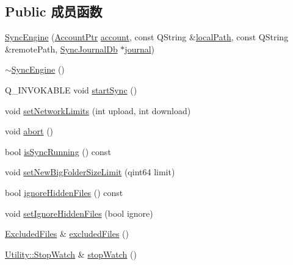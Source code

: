 \subsection*{Public 成员函数}
\begin{DoxyCompactItemize}
\item 
\hyperlink{class_o_c_c_1_1_sync_engine_a2c11f89112096e9b5c0c900bfd3559a1}{Sync\+Engine} (\hyperlink{namespace_o_c_c_a848616aedb9188e223c6b9867757fe69}{Account\+Ptr} \hyperlink{class_o_c_c_1_1_sync_engine_acf2809ef8a773ce4b3c16faf4f4a250e}{account}, const Q\+String \&\hyperlink{class_o_c_c_1_1_sync_engine_acc63fae6a51d4321a46365477d8f657f}{local\+Path}, const Q\+String \&remote\+Path, \hyperlink{class_o_c_c_1_1_sync_journal_db}{Sync\+Journal\+Db} $\ast$\hyperlink{class_o_c_c_1_1_sync_engine_af598f7fc3361738ca90890d277708b3c}{journal})
\item 
\hyperlink{class_o_c_c_1_1_sync_engine_afb126d8c09b84b002a91a1e7c9ef0b37}{$\sim$\+Sync\+Engine} ()
\item 
Q\+\_\+\+I\+N\+V\+O\+K\+A\+B\+LE void \hyperlink{class_o_c_c_1_1_sync_engine_a1c6044eb2ae0956c79b6675b988d983f}{start\+Sync} ()
\item 
void \hyperlink{class_o_c_c_1_1_sync_engine_a31ec45437804b002876b85e2705970ce}{set\+Network\+Limits} (int upload, int download)
\item 
void \hyperlink{class_o_c_c_1_1_sync_engine_aa6750dc1acc1929b6ca7e9fb9511b095}{abort} ()
\item 
bool \hyperlink{class_o_c_c_1_1_sync_engine_aa7bc53df9910b194726010562a7489af}{is\+Sync\+Running} () const
\item 
void \hyperlink{class_o_c_c_1_1_sync_engine_ab3078c73a1523484019c37e5c9eaca88}{set\+New\+Big\+Folder\+Size\+Limit} (qint64 limit)
\item 
bool \hyperlink{class_o_c_c_1_1_sync_engine_a256063a5dcd1a9746c8669edfcab1735}{ignore\+Hidden\+Files} () const
\item 
void \hyperlink{class_o_c_c_1_1_sync_engine_a70696463105e2f4e8554ace3a1bcd8c2}{set\+Ignore\+Hidden\+Files} (bool ignore)
\item 
\hyperlink{class_o_c_c_1_1_excluded_files}{Excluded\+Files} \& \hyperlink{class_o_c_c_1_1_sync_engine_aff2037ba0319ee2a000af5733d57898b}{excluded\+Files} ()
\item 
\hyperlink{class_o_c_c_1_1_utility_1_1_stop_watch}{Utility\+::\+Stop\+Watch} \& \hyperlink{class_o_c_c_1_1_sync_engine_ac1a8207800c5806be8f8d1af1cb41720}{stop\+Watch} ()
\item 

\end{DoxyCompactItemize}
